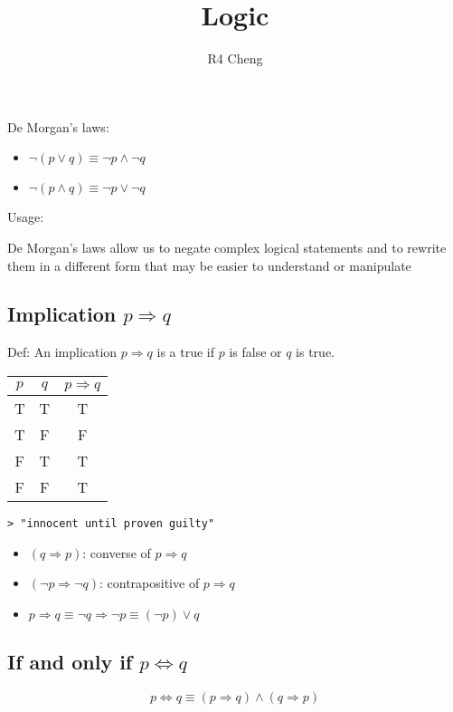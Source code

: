 \documentclass[12pt,a4paper]{article}
\title{Logic}
\author{R4 Cheng}
\begin{document}
\maketitle

De Morgan's laws:
\begin{itemize}
  \item $\neg (p \lor q) \equiv \neg p \land \neg q $
  \item $\neg (p \land q) \equiv \neg p \lor \neg q $
\end{itemize}

Usage:

De Morgan's laws allow us to negate complex logical statements and to rewrite them in a different form that may be easier to understand or manipulate

\subsection*{Implication $p \Rightarrow q$}
Def: An implication $p \Rightarrow q$ is a true if $p$ is false or $q$ is true.

\begin{tabular}{|c|c|c|}
\hline
$p$ & $q$ & $p \Rightarrow q$ \\
\hline
T & T & T \\
T & F & F \\
F & T & T \\
F & F & T \\
\hline
\end{tabular}

\texttt{> "innocent until proven guilty" }

\begin{itemize}
  \item $(q \Rightarrow p)$: converse of $p \Rightarrow q$
  \item $(\neg p \Rightarrow \neg q)$: contrapositive of $p \Rightarrow q$
  \item $p \Rightarrow q \equiv \neg q \Rightarrow \neg p \equiv (\neg p) \lor q $
\end{itemize}

\subsection*{If and only if $p \Leftrightarrow q$}

$$ p \Leftrightarrow q \equiv (p \Rightarrow q) \land (q \Rightarrow p) $$
\end{document}
